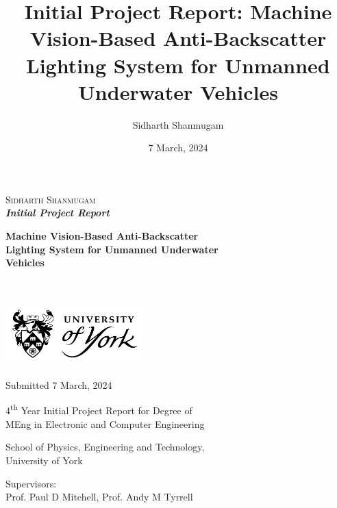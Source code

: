 \documentclass[12pt]{article}
\title{Initial Project Report: Machine Vision-Based Anti-Backscatter Lighting System for Unmanned Underwater Vehicles}
\author{Sidharth Shanmugam}
\date{7 March, 2024}
\begin{document}
\begin{onehalfspace}
    \begin{titlepage}

        \begin{FlushLeft}
            \textsc{\LARGE Sidharth Shanmugam}\\[0.8cm]
    
            \Large{
                \bfseries{
                    \emph{Initial Project Report}}}
            
            \hrulefill
    
            
            \LARGE{
                \bfseries{
                    Machine Vision-Based Anti-Backscatter\\Lighting System for Unmanned Underwater\\Vehicles}}
            
            \hrulefill\\[7.2cm]
    
        \end{FlushLeft}
        
        \vfill

        \begin{Center}
    
            \includegraphics[width=0.4\textwidth]{assets/uoy-logo-stacked-shield.png}

            \vfill
    
            \textsf{
                \large{
                    Submitted 7 March, 2024}}
    
            \vfill
    
            \textsf{
                \large{
                    4\textsuperscript{th} Year Initial Project Report for Degree of\\ MEng in Electronic and Computer Engineering}}
    
            \vfill
            
            \textsf{
                \large{
                    School of Physics, Engineering and Technology,\\ University of York}}
    
            \vfill
    
            \textsf{
                \large{
                    Supervisors:\\[0.2cm] Prof. Paul D Mitchell, Prof. Andy M Tyrrell}}
        
        \end{Center}
        
    \end{titlepage}
\end{onehalfspace}
\end{document}
